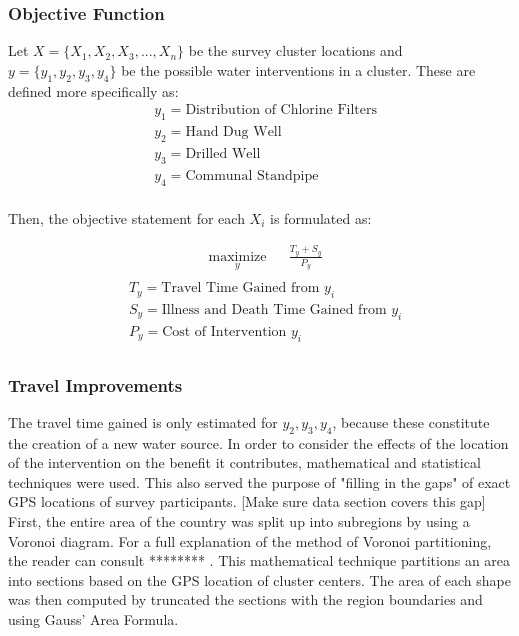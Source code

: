 \subsubsection*{Objective Function}
Let $X = \{X_1,X_2,X_3,...,X_n\}$ be the survey cluster locations and $y = \{y_1,y_2,y_3,y_4\}$ be the possible water interventions in a cluster.
These are defined more specifically as:
\begin{equation}
\begin{aligned} 
& y_1 = \text{Distribution of Chlorine Filters}\\
& y_2 = \text{Hand Dug Well}\\
& y_3 = \text{Drilled Well}\\
& y_4 = \text{Communal Standpipe}\\
\end{aligned}
\end{equation}

Then, the objective statement for each $X_i$ is formulated as: %

\begin{equation}
\begin{aligned}
& \underset{y}{\text{maximize}}
& & \frac{T_y + S_y}{P_y}  \\
\end{aligned}
\end{equation}
\begin{equation*}
\begin{aligned}
& T_y = \text{Travel Time Gained from } y_i \\
& S_y = \text{Illness and Death Time Gained from } y_i \\
& P_y = \text{Cost of Intervention } y_i \\
\end{aligned}
\end{equation*}

\subsubsection*{Travel Improvements}
The travel time gained is only estimated for $y_2,y_3,y_4$, because these constitute the creation of a new water source.
In order to consider the effects of the location of the intervention on the benefit it contributes, mathematical and statistical techniques were used.
This also served the purpose of "filling in the gaps" of exact GPS locations of survey participants.
[Make sure data section covers this gap]
First, the entire area of the country was split up into subregions by using a Voronoi diagram.
For a full explanation of the method of Voronoi partitioning, the reader can consult ******** .
This mathematical technique partitions an area into sections based on the GPS location of cluster centers. %
The area of each shape was then computed by truncated the sections with the region boundaries and using Gauss' Area Formula. %

